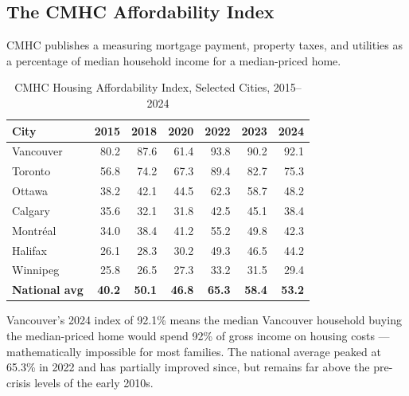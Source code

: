 \subsection{The CMHC Affordability Index}

CMHC publishes a  measuring mortgage
payment, property taxes, and utilities as a percentage of median household
income for a median-priced home.

\begin{table}[H]
\centering
\caption{CMHC Housing Affordability Index, Selected Cities, 2015--2024}
\label{tab:affordability_index}
\renewcommand{\arraystretch}{1.30}
\begin{tabular}{lrrrrrr}
\toprule
\textbf{City} & \textbf{2015} & \textbf{2018} & \textbf{2020}
              & \textbf{2022} & \textbf{2023} & \textbf{2024} \\
\midrule
Vancouver  & 80.2 & 87.6 & 61.4 & 93.8 & 90.2 & 92.1 \\
Toronto    & 56.8 & 74.2 & 67.3 & 89.4 & 82.7 & 75.3 \\
Ottawa     & 38.2 & 42.1 & 44.5 & 62.3 & 58.7 & 48.2 \\
Calgary    & 35.6 & 32.1 & 31.8 & 42.5 & 45.1 & 38.4 \\
Montr\'{e}al & 34.0 & 38.4 & 41.2 & 55.2 & 49.8 & 42.3 \\
Halifax    & 26.1 & 28.3 & 30.2 & 49.3 & 46.5 & 44.2 \\
Winnipeg   & 25.8 & 26.5 & 27.3 & 33.2 & 31.5 & 29.4 \\
\textbf{National avg} & \textbf{40.2} & \textbf{50.1} & \textbf{46.8}
                      & \textbf{65.3} & \textbf{58.4} & \textbf{53.2} \\
\bottomrule
\end{tabular}
\end{table}

Vancouver's 2024 index of 92.1\% means the median Vancouver household
buying the median-priced home would spend 92\% of gross income on housing
costs --- mathematically impossible for most families. The national average
peaked at 65.3\% in 2022 and has partially improved since, but remains
far above the pre-crisis levels of the early 2010s.

